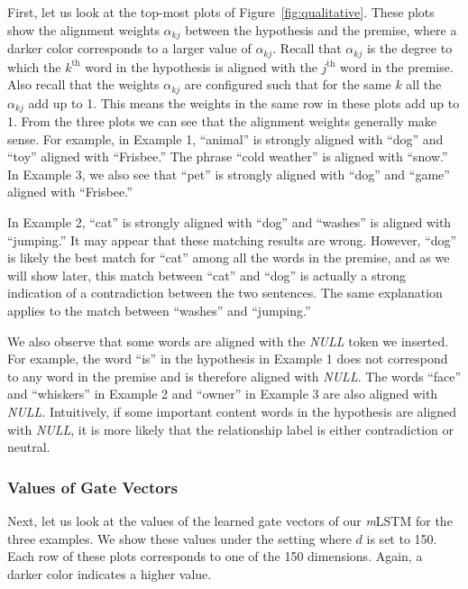 \documentclass[11pt,letterpaper]{article}
\begin{document}
First, let us look at the top-most plots of Figure~\ref{fig:qualitative}.
These plots show the alignment weights $\alpha_{kj}$ between the hypothesis and the premise, where a darker color corresponds to a larger value of $\alpha_{kj}$.
Recall that $\alpha_{kj}$ is the degree to which the $k^{\mathrm{th}}$ word in the hypothesis is aligned with the $j^{\mathrm{th}}$ word in the premise.
Also recall that the weights $\alpha_{kj}$ are configured such that for the same $k$ all the $\alpha_{kj}$ add up to 1.
This means the weights in the same row in these plots add up to 1.
From the three plots we can see that the alignment weights generally make sense.
For example, in Example 1, ``animal'' is strongly aligned with ``dog'' and ``toy'' aligned with ``Frisbee.''
The phrase ``cold weather'' is aligned with ``snow.''
In Example 3, we also see that ``pet'' is strongly aligned with ``dog'' and ``game'' aligned with ``Frisbee.''

In Example 2, ``cat'' is strongly aligned with ``dog'' and ``washes'' is aligned with ``jumping.''
It may appear that these matching results are wrong.
However, ``dog'' is likely the best match for ``cat'' among all the words in the premise, and as we will show later, this match between ``cat'' and ``dog'' is actually a strong indication of a contradiction between the two sentences.
The same explanation applies to the match between ``washes'' and ``jumping.''

We also observe that some words are aligned with the \emph{NULL} token we inserted.
For example, the word ``is'' in the hypothesis in Example 1 does not correspond to any word in the premise and is therefore aligned with \emph{NULL}.
The words ``face'' and ``whiskers'' in Example 2 and ``owner'' in Example 3 are also aligned with \emph{NULL}.
Intuitively, if some important content words in the hypothesis 
are aligned with \emph{NULL}, it is more likely that the relationship label is either contradiction or neutral.


\subsubsection*{Values of Gate Vectors}

Next, let us look at the values of the learned gate vectors of our \emph{m}LSTM for the three examples.
We show these values under the setting where $d$ is set to 150.
Each row of these plots corresponds to one of the 150 dimensions.
Again, a darker color indicates a higher value.
\end{document}
